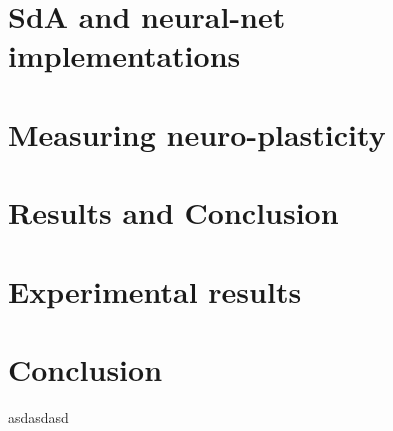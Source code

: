 \documentclass[12pt]{article}
\begin{document}
	\section{SdA and neural-net implementations}
	\section{Measuring neuro-plasticity}
\section{Results and Conclusion}
	\section{Experimental results}
	\section{Conclusion}



\begin{thebibliography}{99}
\singlespacing

 asdasdasd

\end{thebibliography}
\end{document}

